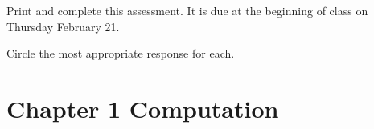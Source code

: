 \documentclass[12pt]{exam}
\begin{document}
\begin{center}
\end{center}
\vspace{0.1in}

\vspace{12pt}

Print and complete this assessment. It is due at the beginning of class on
Thursday February 21.

\vspace{1em}

Circle the most appropriate response for each.

\section*{Chapter 1 Computation}
\end{document}
